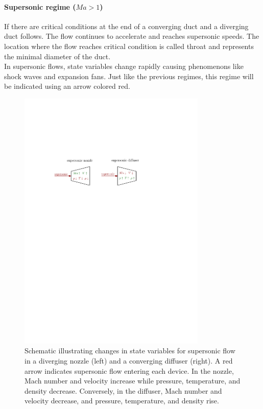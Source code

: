 	\paragraph{Supersonic regime ($Ma > 1$)} 
		If there are critical conditions at the end of a converging duct and a diverging duct follows.
		The flow continues to accelerate and reaches supersonic speeds.
		The location where the flow reaches critical condition is called throat and represents the minimal diameter of the duct.\\
		In supersonic flows, state variables change rapidly causing phenomenons like shock waves and expansion fans.
		Just like the previous regimes, this regime will be indicated using an arrow colored red.
		\cite{Cantwell_AA210A}
		\begin{figure}[H]
		    \centering
		    \includegraphics[width=0.8\textwidth]{src/02_foundations/fig_variable-change-supersonic.pdf}
			\caption{
				Schematic illustrating changes in state variables for supersonic flow in a diverging nozzle (left) and a converging diffuser (right).
				A red arrow indicates supersonic flow entering each device.
				In the nozzle, Mach number and velocity increase while pressure, temperature, and density decrease.
				Conversely, in the diffuser, Mach number and velocity decrease, and pressure, temperature, and density rise.
				\cite{Cengel2017}
			}
		\end{figure}
